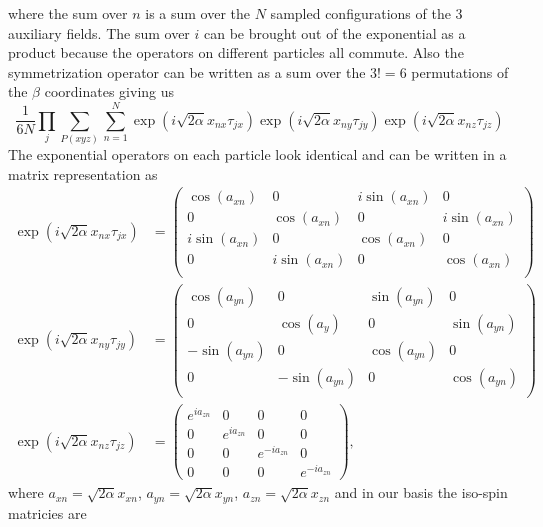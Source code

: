 \documentclass[12pt]{article}
\begin{document}
where the sum over $n$ is a sum over the $N$ sampled configurations of the 3 auxiliary fields. The sum over $i$ can be brought out of the exponential as a product because the operators on different particles all commute. Also the symmetrization operator can be written as a sum over the $3!=6$ permutations of the $\beta$ coordinates giving us
\begin{equation}
   \frac{1}{6N} \prod\limits_j \sum\limits_{P(xyz)} \sum\limits_{n=1}^N \exp{\left(i\sqrt{2\alpha}x_{nx} \tau_{jx}\right)} \exp{\left(i\sqrt{2\alpha}x_{ny} \tau_{jy}\right)} \exp{\left(i\sqrt{2\alpha}x_{nz} \tau_{jz}\right)}
\end{equation}
The exponential operators on each particle look identical and can be written in a matrix representation as
\begin{align}
\exp\left(i\sqrt{2\alpha}x_{nx}\tau_{jx}\right) &=
\begin{pmatrix}
    \cos(a_{xn}) & 0 & i\sin(a_{xn}) & 0 \\
    0 & \cos(a_{xn}) & 0 & i\sin(a_{xn}) \\
    i\sin(a_{xn}) & 0 & \cos(a_{xn}) & 0 \\
    0 & i\sin(a_{xn}) & 0 & \cos(a_{xn}) \\
\end{pmatrix} \\
\exp\left(i\sqrt{2\alpha}x_{ny}\tau_{jy}\right) &=
\begin{pmatrix}
    \cos(a_{yn}) & 0 & \sin(a_{yn}) & 0 \\
    0 & \cos(a_y) & 0 & \sin(a_{yn}) \\
    -\sin(a_{yn}) & 0 & \cos(a_{yn}) & 0 \\
    0 & -\sin(a_{yn}) & 0 & \cos(a_{yn}) \\
\end{pmatrix} \\
\exp\left(i\sqrt{2\alpha}x_{nz}\tau_{jz}\right) &=
\begin{pmatrix}
    e^{ia_{zn}} & 0 & 0 & 0 \\
    0 & e^{ia_{zn}} & 0 & 0 \\
    0 & 0 & e^{-ia_{zn}} & 0 \\
    0 & 0 & 0 & e^{-ia_{zn}}
\end{pmatrix},
\end{align}
where $a_{xn}=\sqrt{2\alpha}x_{xn}$, $a_{yn}=\sqrt{2\alpha}x_{yn}$, $a_{zn}=\sqrt{2\alpha}x_{zn}$ and in our basis the iso-spin matricies are
\end{document}
